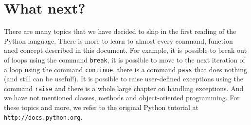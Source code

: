 \documentclass[article,A4,12pt]{llncs}
\begin{document}
\section{What next?} \label{sec:adv}

There are many topics that we have decided to skip in the first reading 
of the Python language. There is more to learn to almost every command,
function aned concept described in this document. For example, it is possible
to break out of loops using the command {\tt break}, it is possible to 
move to the next iteration of a loop using the command {\tt continue},
there is a command {\tt pass} that does nothing (and still can be useful!). It is possible to 
raise user-defined exceptions using the command {\tt raise} and there
is a whole large chapter on handling exceptions. And we have not 
mentioned classes, methods and object-oriented programming. For these
topics and more, we refer to the original Python tutorial at 
{\tt http://docs.python.org}. 
\end{document}
